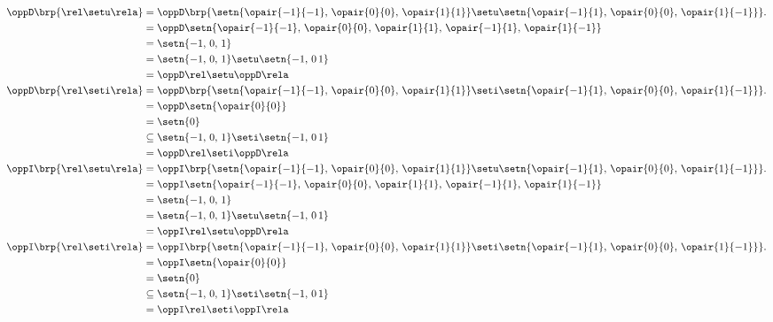 {\begin{example}
\begin{align*}
  \oppD\brp{\rel\setu\rela} 
    &= \oppD\brp{\setn{\opair{-1}{-1},\, \opair{0}{0},\, \opair{1}{1}} \setu \setn{\opair{-1}{1},\, \opair{0}{0},\, \opair{1}{-1}}}.
  \\&= \oppD\setn{\opair{-1}{-1},\, \opair{0}{0},\, \opair{1}{1},\, \opair{-1}{1},\, \opair{1}{-1}}
  \\&= \setn{-1,\,0,\,1}
  \\&= \setn{-1,\,0,\,1}\setu\setn{-1,\,0\,1}
  \\&=  \oppD\rel \setu \oppD\rela
  \\
  \oppD\brp{\rel\seti\rela} 
    &= \oppD\brp{\setn{\opair{-1}{-1},\, \opair{0}{0},\, \opair{1}{1}} \seti \setn{\opair{-1}{1},\, \opair{0}{0},\, \opair{1}{-1}}}.
  \\&= \oppD\setn{\opair{0}{0}}
  \\&= \setn{0}
  \\&\subseteq \setn{-1,\,0,\,1}\seti\setn{-1,\,0\,1}
  \\&=  \oppD\rel \seti \oppD\rela
  \\
  \oppI\brp{\rel\setu\rela} 
    &= \oppI\brp{\setn{\opair{-1}{-1},\, \opair{0}{0},\, \opair{1}{1}} \setu \setn{\opair{-1}{1},\, \opair{0}{0},\, \opair{1}{-1}}}.
  \\&= \oppI\setn{\opair{-1}{-1},\, \opair{0}{0},\, \opair{1}{1},\, \opair{-1}{1},\, \opair{1}{-1}}
  \\&= \setn{-1,\,0,\,1}
  \\&= \setn{-1,\,0,\,1}\setu\setn{-1,\,0\,1}
  \\&=  \oppI\rel \setu \oppD\rela
  \\
  \oppI\brp{\rel\seti\rela} 
    &= \oppI\brp{\setn{\opair{-1}{-1},\, \opair{0}{0},\, \opair{1}{1}} \seti \setn{\opair{-1}{1},\, \opair{0}{0},\, \opair{1}{-1}}}.
  \\&= \oppI\setn{\opair{0}{0}}
  \\&= \setn{0}
  \\&\subseteq \setn{-1,\,0,\,1}\seti\setn{-1,\,0\,1}
  \\&=  \oppI\rel \seti \oppI\rela
\end{align*}

\end{example}


}
